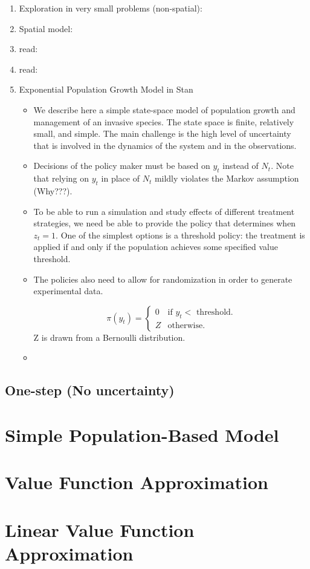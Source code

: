 \documentclass{article}
\theoremstyle{remark}
\theoremstyle{remark}
\theoremstyle{remark}
\theoremstyle{remark}
\theoremstyle{remark}
\theoremstyle{remark}
\newcommand{\marek}[1]{\textcolor{Bittersweet}{#1}}
\begin{document}
\begin{enumerate}
\begin{itemize}
	\end{itemize}
	\item Exploration in very small problems (non-spatial): \cite{Hall2018,Taleghan2015}
	\item Spatial model: \cite{Nicol2017}
	\item \marek{read}: \cite{Albers2018}
	\item \marek{read}: \cite{Mehta2007}
	\item Exponential Population Growth Model in Stan
	\begin{itemize}
		\item We describe here a simple state-space model of population growth and management of an invasive species. The state space is finite, relatively small, and simple. The main challenge is the high level of uncertainty that is involved in the dynamics of the system and in the observations.
		\item Decisions of the policy maker must be based on $y_t$ instead of $N_t$. Note that relying on $y_t$ in place of $N_t$ mildly violates the Markov assumption (Why???).
		\item To be able to run a simulation and study effects of different treatment strategies, we need be able to provide the policy that determines when $z_t=1$. One of the simplest options is a threshold policy: the treatment is applied if and only if the population achieves some specified value threshold.
		\item The policies also need to allow for randomization in order to generate experimental data.

		\begin{equation}
		  \pi(y_t)=\begin{cases}
		    0 & \text{if $y_t <$  threshold}.\\
		    Z & \text{otherwise}.
		  \end{cases}
		\end{equation}
		Z is drawn from a Bernoulli distribution.
		\item



	\end{itemize}
\end{enumerate}

\subsection{One-step (No uncertainty)}

\section{Simple Population-Based Model}


\section{Value Function Approximation}

\section{Linear Value Function Approximation}





\end{document}
